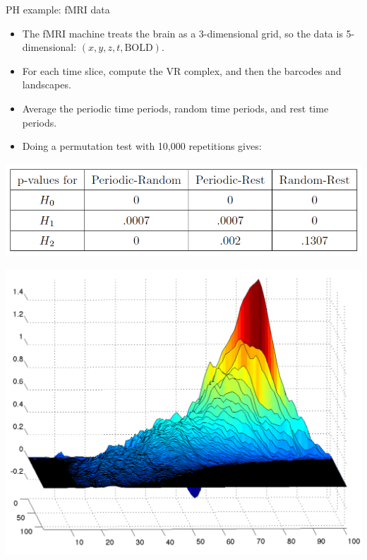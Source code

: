 \documentclass[usenames,dvipsnames,aspectratio=1610]{beamer}
\begin{document}
\begin{frame}{PH example: fMRI data}
  \begin{itemize}
    \item The fMRI machine treats the brain as a 3-dimensional grid, so 
      the data is 5-dimensional: $(x,y,z,t,\mathrm{BOLD})$.
    \item For each time slice, compute the VR complex, and then the
      barcodes and landscapes.
    \item Average the periodic time periods, random time periods, and rest time periods.
    \item Doing a permutation test with 10,000 repetitions gives:
  \end{itemize}
  \begin{minipage}{0.7\textwidth}
    \centering
    \includegraphics[scale=0.4]{ptest.png}
  \end{minipage}
  \begin{minipage}{0.25\textwidth}
    \centering
    \includegraphics[scale=0.15]{pl_h1.png}
  \end{minipage}
\end{frame}
\end{document}
